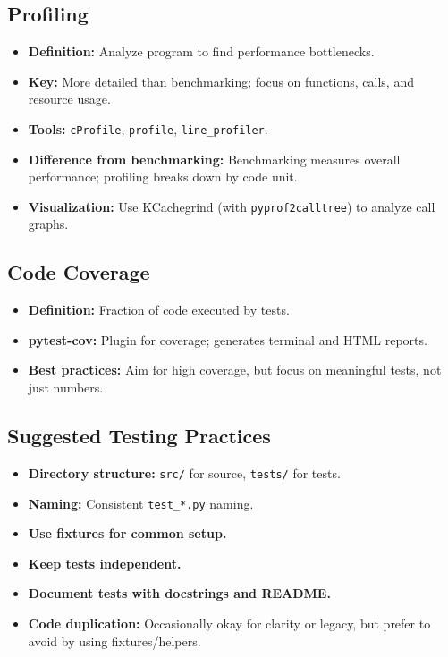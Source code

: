\documentclass[11pt,a4paper]{article}
\begin{document}
\subsection*{Profiling}
\begin{itemize}
    \item \textbf{Definition:} Analyze program to find performance bottlenecks.
    \item \textbf{Key:} More detailed than benchmarking; focus on functions, calls, and resource usage.
    \item \textbf{Tools:} \texttt{cProfile}, \texttt{profile}, \texttt{line\_profiler}.
    \item \textbf{Difference from benchmarking:} Benchmarking measures overall performance; profiling breaks down by code unit.
    \item \textbf{Visualization:} Use KCachegrind (with \texttt{pyprof2calltree}) to analyze call graphs.
\end{itemize}

\subsection*{Code Coverage}
\begin{itemize}
    \item \textbf{Definition:} Fraction of code executed by tests.
    \item \textbf{pytest-cov:} Plugin for coverage; generates terminal and HTML reports.
    \item \textbf{Best practices:} Aim for high coverage, but focus on meaningful tests, not just numbers.
\end{itemize}

\subsection*{Suggested Testing Practices}
\begin{itemize}
    \item \textbf{Directory structure:} \texttt{src/} for source, \texttt{tests/} for tests.
    \item \textbf{Naming:} Consistent \texttt{test\_*.py} naming.
    \item \textbf{Use fixtures for common setup.}
    \item \textbf{Keep tests independent.}
    \item \textbf{Document tests with docstrings and README.}
    \item \textbf{Code duplication:} Occasionally okay for clarity or legacy, but prefer to avoid by using fixtures/helpers.
\end{itemize}
\end{document}
